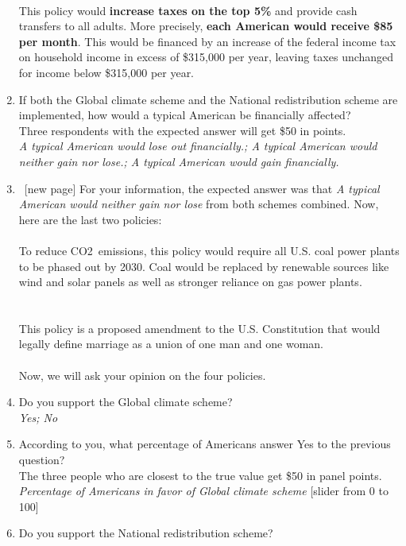 \begin{enumerate}[resume]
\\
\textbf{} This policy would \textbf{increase taxes on the top 5\%} and provide cash transfers to all adults. More precisely, \textbf{each American would receive \$85 per month}. This would be financed by an increase of the federal income tax on household income in excess of \$315,000 per year, leaving taxes unchanged for income below \$315,000 per year.
\item If both the Global climate scheme and the National redistribution scheme are implemented, how would a typical American be financially affected?\\
Three respondents with the expected answer will get \$50 in points.
\\ \textit{A typical American would lose out financially.; A typical American would neither gain nor lose.; A typical American would gain financially.}
\item ~[new page] For your information, the expected answer was that \textit{A typical American would neither gain nor lose} from both schemes combined. Now, here are the last two policies:\\
\\
\textbf{} To reduce CO2~emissions, this policy would require all U.S. coal power plants to be phased out by 2030. Coal would be replaced by renewable sources like wind and solar panels as well as stronger reliance on gas power plants.\\
\\
\textbf{}\\
This policy is a proposed amendment to the U.S. Constitution that would legally define marriage as a union of one man and one woman.\\
\\
Now, we will ask your opinion on the four policies.\\
\item Do you support the Global climate scheme?
\\ \textit{Yes; No}
\item According to you, what percentage of Americans answer Yes to the previous question?\\
The three people who are closest to the true value get \$50 in panel points.
\\ \textit{Percentage of Americans in favor of Global climate scheme} [slider from 0 to 100]
\item Do you support the National redistribution scheme?

\end{enumerate}
